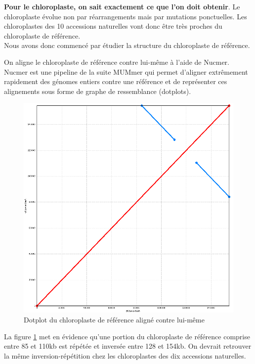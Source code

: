 \documentclass[a4paper]{article}
\begin{document}
\textbf{Pour le chloroplaste, on sait exactement ce que l'on doit obtenir}. Le chloroplaste évolue non par réarrangements mais par mutations ponctuelles. Les chloroplastes des 10 accessions naturelles vont donc être très proches du chloroplaste de référence. \\

Nous avons donc commencé par étudier la structure du chloroplaste de référence. 

On aligne le chloroplaste de référence contre lui-même à l'aide de Nucmer. Nucmer est une pipeline de la suite MUMmer qui permet d'aligner extrêmement rapidement des génomes entiers contre une référence et de représenter ces alignements sous forme de graphe de ressemblance (dotplots).  

\begin{figure}[!ht]
\centering
\includegraphics[scale=0.3] {Assemblage/chloroVSchloro.png}
\caption{Dotplot du chloroplaste de référence aligné contre lui-même}
\label{temoinchloro}
\end{figure}

La figure \ref{temoinchloro} met en évidence qu'une portion du chloroplaste de référence comprise entre 85 et 110kb est répétée et inversée entre 128 et 154kb. On devrait retrouver la même inversion-répétition chez les chloroplastes des dix accessions naturelles. 
\end{document}

